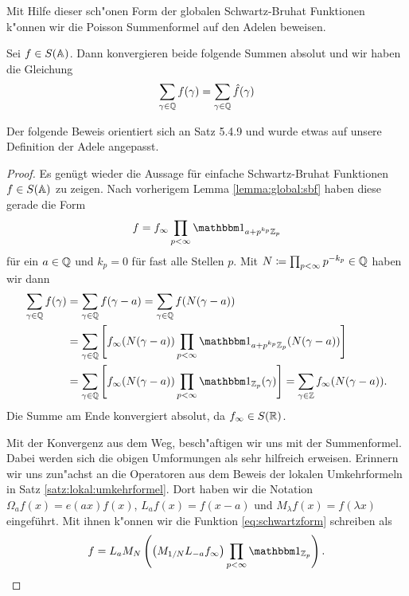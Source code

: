 	Mit Hilfe dieser sch"onen Form der globalen Schwartz-Bruhat Funktionen k"onnen wir die Poisson Summenformel auf den Adelen beweisen.
	\begin{satz}
	\label{satz:tateproof:poisson}
		Sei $f \in S(\mathbb{A})$. Dann konvergieren beide folgende Summen absolut und wir haben die Gleichung
		\begin{align}
			\sum_{\gamma \in \mathbb{Q}} {f(\gamma)} = \sum_{\gamma \in \mathbb{Q}}{\hat{f}(\gamma)} \label{eq:tateproof:fourier}
		\end{align}
	\end{satz}
	Der folgende Beweis orientiert sich an \textcite{deitmar2010} Satz 5.4.9 und wurde etwas auf unsere Definition der Adele angepasst.
	\begin{proof}
		Es genügt wieder die Aussage für einfache Schwartz-Bruhat Funktionen $f \in S(\mathbb{A})$ zu zeigen.
		Nach vorherigem Lemma \ref{lemma:global:sbf} haben diese gerade die Form
		\begin{align}\label{eq:schwartzform}
			f = f_\infty\prod_{p<\infty} \ind_{a+p^{k_p}\Zp}
		\end{align}
		für ein $a \in \mathbb{Q}$ und $k_p = 0$ für fast alle Stellen $p$.
		Mit $N\coloneqq \prod_{p<\infty} p^{-k_p} \in \mathbb{Q}$ haben wir dann
		\begin{align*}
			\sum_{\gamma \in \K} {f(\gamma)} 	&= 	\sum_{\gamma \in \K} f(\gamma - a)
												= 	\sum_{\gamma \in \K} f(N(\gamma - a)) \\
												&= 	\sum_{\gamma \in \K} \left[ f_\infty (N(\gamma - a)) \prod_{p< \infty} \ind_{a+p^{k_p}\Zp}(N(\gamma - a)) \right] \\
												&= 	\sum_{\gamma \in \K} \left[ f_\infty (N(\gamma - a)) \prod_{p< \infty} \ind_{\Zp}(\gamma) \right]
												=	\sum_{\gamma \in \Z} f_\infty (N(\gamma - a)).
		\end{align*}
		Die Summe am Ende konvergiert absolut, da $f_\infty \in S(\mathbb{R})$.
		
		Mit der Konvergenz aus dem Weg, besch"aftigen wir uns mit der Summenformel.
		Dabei werden sich die obigen Umformungen als sehr hilfreich erweisen.
		Erinnern wir uns zun"achst an die Operatoren aus dem Beweis der lokalen Umkehrformeln in Satz \ref{satz:lokal:umkehrformel}.
		Dort haben wir die Notation $\Omega_a f(x) = e(ax)f(x)$, $L_a f(x) = f(x-a)$ und $M_\lambda f(x) = f(\lambda x)$ eingeführt.
		Mit ihnen k"onnen wir die Funktion \eqref{eq:schwartzform} schreiben als
		\begin{align*}
			f = L_a M_{N}\left( \left(M_{1/N} L_{-a} f_\infty\right) \prod_{p<\infty}\ind_{\Zp}\right).
		\end{align*}
		

\end{proof}
